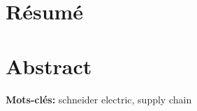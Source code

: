 \section*{\Large \center Résumé}
\lipsum[1]

\vspace{1cm} %

\section*{\Large \center Abstract}
\lipsum[1]

\newcommand{\mykeywords}[1]{\noindent \textbf{Mots-clés:} #1}
\mykeywords{schneider electric, supply chain}